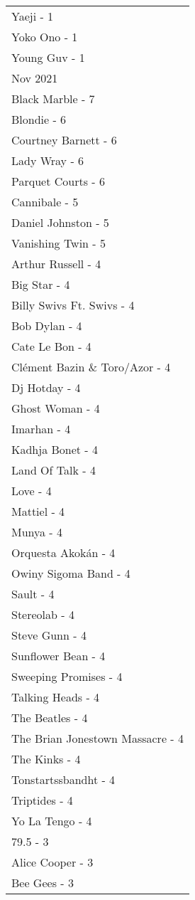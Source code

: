\documentclass[
]{article}
\begin{document}
\begin{longtable}{l}
Yaeji - 1 \\ 
Yoko Ono - 1 \\ 
Young Guv - 1 \\ 
\midrule
\multicolumn{1}{l}{Nov 2021} \\ 
\midrule
Black Marble - 7 \\ 
Blondie - 6 \\ 
Courtney Barnett - 6 \\ 
Lady Wray - 6 \\ 
Parquet Courts - 6 \\ 
Cannibale - 5 \\ 
Daniel Johnston - 5 \\ 
Vanishing Twin - 5 \\ 
Arthur Russell - 4 \\ 
Big Star - 4 \\ 
Billy Swivs Ft. Swivs - 4 \\ 
Bob Dylan - 4 \\ 
Cate Le Bon - 4 \\ 
Clément Bazin \& Toro/Azor - 4 \\ 
Dj Hotday - 4 \\ 
Ghost Woman - 4 \\ 
Imarhan - 4 \\ 
Kadhja Bonet - 4 \\ 
Land Of Talk - 4 \\ 
Love - 4 \\ 
Mattiel - 4 \\ 
Munya - 4 \\ 
Orquesta Akokán - 4 \\ 
Owiny Sigoma Band - 4 \\ 
Sault - 4 \\ 
Stereolab - 4 \\ 
Steve Gunn - 4 \\ 
Sunflower Bean - 4 \\ 
Sweeping Promises - 4 \\ 
Talking Heads - 4 \\ 
The Beatles - 4 \\ 
The Brian Jonestown Massacre - 4 \\ 
The Kinks - 4 \\ 
Tonstartssbandht - 4 \\ 
Triptides - 4 \\ 
Yo La Tengo - 4 \\ 
79.5 - 3 \\ 
Alice Cooper - 3 \\ 
Bee Gees - 3 \\ 

\end{longtable}
\end{document}
